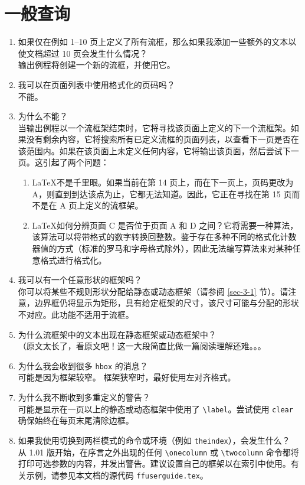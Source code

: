 \documentclass[a4paper]{book}%
\newcommand{\filename}[1]{\texttt{#1}}
\newcommand{\cmd}[1]{\texttt{#1}}
\begin{document}
\section{一般查询}%
\begin{enumerate}
    \item 如果仅在例如 1{--}10 页上定义了所有流框，那么如果我添加一些额外的文本以使文档超过 10 页会发生什么情况？\\ 输出例程将创建一个新的流框，并使用它。
    \item 我可以在页面列表中使用格式化的页码吗？\\ 不能。
    \item 为什么不能？\\ 当输出例程以一个流框架结束时，它将寻找该页面上定义的下一个流框架。如果没有剩余内容，它将搜索所有已定义流框的页面列表，以查看下一页是否在该范围内。如果在该页面上未定义任何内容，它将输出该页面，然后尝试下一页。这引起了两个问题：
    \begin{enumerate}
        \item \LaTeX 不是千里眼。如果当前在第 14 页上，而在下一页上，页码更改为 A，则直到到达该点为止，它都无法知道。因此，它正在寻找在第 15 页而不是在 A 页上定义的流框架。
        \item \LaTeX 如何分辨页面 C 是否位于页面 A 和 D 之间？它将需要一种算法，该算法可以将带格式的数字转换回整数。鉴于存在多种不同的格式化计数器值的方式（标准的罗马和字母格式除外），因此无法编写算法来对某种任意格式进行格式化。
    \end{enumerate}\label{page-que-3}\label{que-3}
    \item 我可以有一个任意形状的框架吗？\\ 你可以将某些不规则形状分配给静态或动态框架（请参阅 \ref{sec-3-1} 节）。请注意，边界框仍将显示为矩形，具有给定框架的尺寸，该尺寸可能与分配的形状不对应。此功能不适用于流框。
    \item 为什么流框架中的文本出现在静态框架或动态框架中？\\ （原文太长了，看原文吧！这一大段简直比做一篇阅读理解还难。。。
    \item 为什么我会收到很多 \cmd{hbox} 的消息？\\ 可能是因为框架较窄。 框架狭窄时，最好使用左对齐格式。
    \item 为什么我不断收到多重定义的警告？\\ 可能是显示在一页以上的静态或动态框架中使用了 \verb|\label|。尝试使用 \cmd{clear} 确保始终在每页末尾清除边框。
    \item 如果我使用切换到两栏模式的命令或环境（例如 \cmd{theindex}），会发生什么？\\ 从 1.01 版开始，在序言之外出现的任何 \verb|\onecolumn| 或 \verb|\twocolumn| 命令都将打印可选参数的内容，并发出警告。建议设置自己的框架以在索引中使用。有关示例，请参见本文档的源代码 \filename{ffuserguide.tex}。

\end{enumerate}
\end{document}
